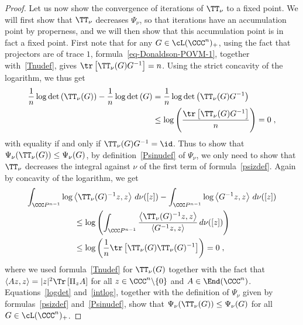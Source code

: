 \begin{proof}
Let us now show the convergence of iterations of $\TT_\nu$ to a fixed point. We will first show that $\TT_\nu$ decreases $\Psi_\nu$, so that iterations have an accumulation point by properness, and we will then show that this accumulation point is in fact a fixed point. First note that for any $G\in\cL(\CCC^n)_+$, using the fact that projectors are of trace $1$, formula~\eqref{eq-Donaldson-POVM-1}, together with~\eqref{Tnudef}, gives $\tr\left[\TT_\nu(G)G^{-1}\right]=n$. Using the strict concavity of the logarithm, we thus get
\begin{equation}\label{logdet}
\begin{split}
\frac{1}{n}\log\det\left(\TT_\nu(G)\right) -\frac{1}{n}\log\det\left(G\right)&=
\frac{1}{n}\log\det\left(\TT_\nu(G)G^{-1}\right)\\
&\leq\log\left(\frac{\tr\left[\TT_\nu(G)G^{-1}\right]}{n}\right) =0\;,
\end{split}
\end{equation}
with equality if and only if $\TT_\nu(G)G^{-1}=\id$. Thus to show that $\Psi_\nu(\TT_\nu(G))\leq\Psi_\nu(G)$, by definition~\eqref{Psinudef} of $\Psi_\nu$, we only need to show that $\TT_\nu$ decreases the integral against $\nu$ of the first term of formula~\eqref{psizdef}. Again by concavity of the logarithm, we get
\begin{multline}\label{intlog}
\int_{\CCC P^{n-1}}\log\left\langle \TT_\nu(G)^{-1}z,z\right\rangle\,d\nu([z])-
\int_{\CCC P^{n-1}}\log\left\langle G^{-1}z,z\right\rangle \,d\nu([z])\\
\begin{aligned}
&\leq\log\left(\int_{\CCC P^{n-1}}\frac{\left\langle\TT_\nu(G)^{-1}z,z\right\rangle} {\left\langle G^{-1}z,z\right\rangle}\,d\nu([z])
\right)\\
&\leq\log\left(\frac{1}{n}
\tr\left[\TT_\nu(G)\TT_\nu(G)^{-1}\right]\right)=0\;,
\end{aligned}
\end{multline}
where we used formula~\eqref{Tnudef} for $\TT_\nu(G)$ together with the fact that $\langle Az,z\rangle\linebreak=|z|^2\Tr\left[\Pi_zA\right]$ for all $z\in\CCC^n\backslash\{0\}$ and $A\in\End(\CCC^n)$. Equations~\eqref{logdet} and~\eqref{intlog}, together with the definition of $\Psi_\nu$ given by formulas~\eqref{psizdef} and~\eqref{Psinudef}, show that $\Psi_\nu(\TT_\nu(G))\leq\Psi_\nu(G)$ for all $G\in\cL(\CCC^n)_+$.


\end{proof}
